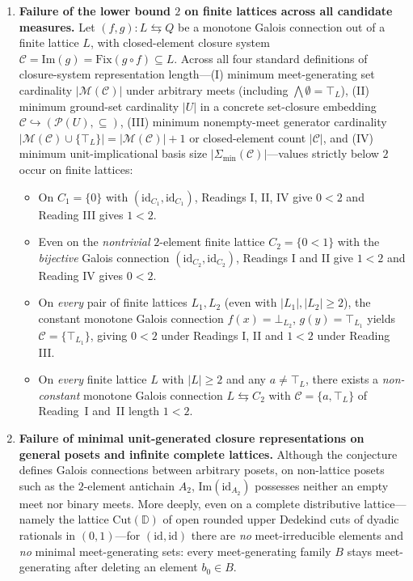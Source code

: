 \documentclass[11pt,a4paper]{article}
\theoremstyle{definition}
\theoremstyle{remark}
\begin{document}
\begin{enumerate}
\item \textbf{Failure of the lower bound $2$ on finite lattices across all candidate measures.} Let $(f, g) : L \leftrightarrows Q$ be a monotone Galois connection out of a finite lattice $L$, with closed-element closure system $\mathcal{C} = \mathrm{Im}(g) = \mathrm{Fix}(g \circ f) \subseteq L$. Across all four standard definitions of closure-system representation length---(I) minimum meet-generating set cardinality $|\mathcal{M}(\mathcal{C})|$ under arbitrary meets (including $\bigwedge \emptyset = \top_L$), (II) minimum ground-set cardinality $|U|$ in a concrete set-closure embedding $\mathcal{C} \hookrightarrow (\mathcal{P}(U), \subseteq)$, (III) minimum nonempty-meet generator cardinality $|\mathcal{M}(\mathcal{C}) \cup \{\top_L\}| = |\mathcal{M}(\mathcal{C})| + 1$ or closed-element count $|\mathcal{C}|$, and (IV) minimum unit-implicational basis size $|\Sigma_{\min}(\mathcal{C})|$---values strictly below $2$ occur on finite lattices:
\begin{itemize}
\item On $C_1 = \{0\}$ with $(\mathrm{id}_{C_1}, \mathrm{id}_{C_1})$, Readings I, II, IV give $0 < 2$ and Reading III gives $1 < 2$.
\item Even on the \emph{nontrivial} $2$-element finite lattice $C_2 = \{0 < 1\}$ with the \emph{bijective} Galois connection $(\mathrm{id}_{C_2}, \mathrm{id}_{C_2})$, Readings I and II give $1 < 2$ and Reading IV gives $0 < 2$.
\item On \emph{every} pair of finite lattices $L_1, L_2$ (even with $|L_1|, |L_2| \ge 2$), the constant monotone Galois connection $f(x) = \bot_{L_2}$, $g(y) = \top_{L_1}$ yields $\mathcal{C} = \{\top_{L_1}\}$, giving $0 < 2$ under Readings I, II and $1 < 2$ under Reading III.
\item On \emph{every} finite lattice $L$ with $|L| \ge 2$ and any $a \neq \top_L$, there exists a \emph{non-constant} monotone Galois connection $L \leftrightarrows C_2$ with $\mathcal{C} = \{a, \top_L\}$ of Reading~I and~II length $1 < 2$.
\end{itemize}

\item \textbf{Failure of minimal unit-generated closure representations on general posets and infinite complete lattices.} Although the conjecture defines Galois connections between arbitrary posets, on non-lattice posets such as the $2$-element antichain $A_2$, $\mathrm{Im}(\mathrm{id}_{A_2})$ possesses neither an empty meet nor binary meets. More deeply, even on a complete distributive lattice---namely the lattice $\mathrm{Cut}(\mathbb{D})$ of open rounded upper Dedekind cuts of dyadic rationals in $(0,1)$---for $(\mathrm{id}, \mathrm{id})$ there are \emph{no} meet-irreducible elements and \emph{no} minimal meet-generating sets: every meet-generating family $B$ stays meet-generating after deleting an element $b_0 \in B$.


\end{enumerate}
\end{document}
